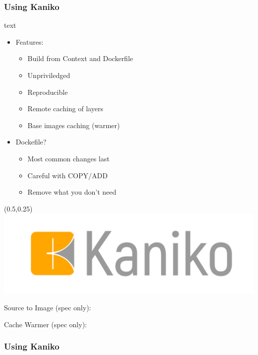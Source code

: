 \documentclass[aspectratio=169,11pt,hyperref={colorlinks=true}]{beamer}
\begin{document}
\begin{lblackrwhiteframe}
\begin{blackframe}
\begin{lblackrwhiteframe}
  \frametitle{Using Kaniko}
  \large
  \begin{beamercolorbox}[wd=0.45\paperwidth]{text}
    \begin{itemize}
      \item Features:
      \begin{itemize}
        \item Build from Context and Dockerfile
        \item Unpriviledged
        \item Reproducible
        \item Remote caching of layers
        \item Base images caching (warmer)
      \end{itemize}
    \end{itemize}
    \vspace{3ex}
    \begin{itemize}
      \item Dockefile?
      \begin{itemize}
        \item Most common changes last
        \item Careful with COPY/ADD
        \item Remove what you don't need
      \end{itemize}
    \end{itemize}
  \end{beamercolorbox}%
  \begin{textblock*}{0.5\paperwidth}(0.5\paperwidth,0.25\paperheight)
    \centering
    \includegraphics[width=0.35\paperwidth]{img/Kaniko-Logo.png}
  \end{textblock*}
\end{lblackrwhiteframe}

\begin{2columnsframe}
  {
  {\tiny Source to Image (spec only): \\}
  
  }
  {
  
  {\tiny Cache Warmer (spec only): \\}
  
  }
  \frametitle{Using Kaniko}
\end{2columnsframe}


\end{blackframe}
\end{lblackrwhiteframe}
\end{document}

